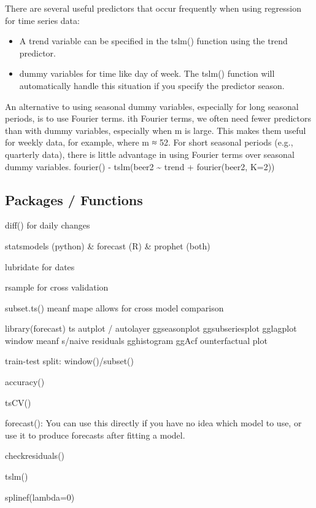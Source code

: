 \documentclass[]{book}
\begin{document}
There are several useful predictors that occur frequently when using
regression for time series data:

\begin{itemize}
\item
  A trend variable can be specified in the tslm() function using the
  trend predictor.
\item
  dummy variables for time like day of week. The tslm() function will
  automatically handle this situation if you specify the predictor
  season.
\end{itemize}

An alternative to using seasonal dummy variables, especially for long
seasonal periods, is to use Fourier terms. ith Fourier terms, we often
need fewer predictors than with dummy variables, especially when m is
large. This makes them useful for weekly data, for example, where m ≈
52. For short seasonal periods (e.g., quarterly data), there is little
advantage in using Fourier terms over seasonal dummy variables.
fourier() - tslm(beer2 \textasciitilde{} trend + fourier(beer2, K=2))

\subsection{Packages / Functions}\label{packages-functions}

diff() for daily changes

statsmodels (python) \& forecast (R) \& prophet (both)

lubridate for dates

rsample for cross validation

subset.ts() \textbar{} meanf \textbar{} mape allows for cross model
comparison

library(forecast) \textbar{} ts \textbar{} autplot / autolayer
\textbar{} ggseasonplot \textbar{} ggsubseriesplot \textbar{} gglagplot
\textbar{} window \textbar{} meanf \textbar{} s/naive \textbar{}
residuals \textbar{} gghistogram \textbar{} ggAcf \textbar{}
ounterfactual plot

train-test split: window()/subset()

accuracy()

tsCV()

forecast(): You can use this directly if you have no idea which model to
use, or use it to produce forecasts after fitting a model.

checkresiduals()

tslm()

splinef(lambda=0)
\end{document}
